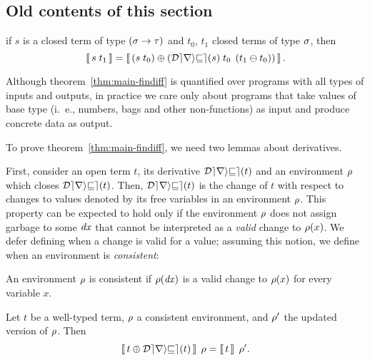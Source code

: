\begin{oldSec}

\section{Old contents of this section}

\begin{theorem}
\label{thm:main-findiff}
if $s$ is a closed term of type $\Fun*\Gs\Gt$ and $t_0$, $t_1$
closed terms of type $\sigma$, then
\[
\Eval{\App s{t_1}}
=
\Eval{\Apply
{\App*{\App{\Derive s}{t_0}}{\Diff*{t_1}{t_0}}}
{\App* s{t_0}}}.
\]
\end{theorem}

Although theorem~\ref{thm:main-findiff} is quantified over
programs with all types of inputs and outputs, in practice we
care only about programs that take values of base type (i.\ e.,
numbers, bags and other non-functions) as input
and produce concrete data as output.

To prove theorem~\ref{thm:main-findiff}, we need two lemmas about derivatives.

First, consider an open term $t$, its derivative
$\Derive{t}$ and an environment $\rho$ which closes $\Derive{t}$.
Then, $\Derive{t}$ is the change of $t$ with respect to changes
to values denoted by its free variables in an environment $\rho$.
This property can be expected to hold
%
only if the environment $\rho$ does not assign garbage to some $\mathit{dx}$ that cannot be interpreted as a \emph{valid} change to
$\rho(x)$. We defer defining when a change is valid for a
value; assuming this notion, we define when an environment
is \emph{consistent}:
%

\begin{definition}
\label{def:consistency}
An environment $\rho$ is consistent if $\rho(\mathit{dx})$ is a valid
change to $\rho(x)$ for every variable $x$.
\end{definition}

\begin{lemma}
\label{lem:freevars}
Let $t$ be a well-typed term, $\rho$ a consistent environment, and
$\rho'$ the updated version of $\rho$. Then
\[
\EvalWith{ \Apply{\Derive t}{t} } \Gr = \EvalWith{t}{\Gr'}.
\]
\end{lemma}


\end{oldSec}
